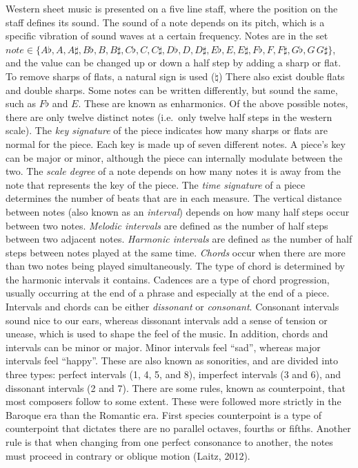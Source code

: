 \documentclass[12pt,twoside]{reedthesis}
\theoremstyle{definition}
\theoremstyle{definition}
\theoremstyle{definition}
\theoremstyle{remark}
\begin{document}
Western sheet music is presented on a five line staff, where the
position on the staff defines its sound. The sound of a note depends on
its pitch, which is a specific vibration of sound waves at a certain
frequency. Notes are in the set
\(note \in \{A\flat,A,A\sharp,B\flat,B,B\sharp,C\flat,C,C\sharp,D\flat,D,D\sharp,E\flat,E,E\sharp,F\flat,F,F\sharp,G\flat,G\,G\sharp\}\),
and the value can be changed up or down a half step by adding a sharp or
flat. To remove sharps of flats, a natural sign is used (\(\natural\))
There also exist double flats and double sharps. Some notes can be
written differently, but sound the same, such as \(F\flat\) and \(E\).
These are known as enharmonics. Of the above possible notes, there are
only twelve distinct notes (i.e.~only twelve half steps in the western
scale). The \emph{key signature} of the piece indicates how many sharps
or flats are normal for the piece. Each key is made up of seven
different notes. A piece's key can be major or minor, although the piece
can internally modulate between the two. The \emph{scale degree} of a
note depends on how many notes it is away from the note that represents
the key of the piece. The \emph{time signature} of a piece determines
the number of beats that are in each measure. The vertical distance
between notes (also known as an \emph{interval}) depends on how many
half steps occur between two notes. \emph{Melodic intervals} are defined
as the number of half steps between two adjacent notes. \emph{Harmonic
intervals} are defined as the number of half steps between notes played
at the same time. \emph{Chords} occur when there are more than two notes
being played simultaneously. The type of chord is determined by the
harmonic intervals it contains. Cadences are a type of chord
progression, usually occurring at the end of a phrase and especially at
the end of a piece. Intervals and chords can be either \emph{dissonant}
or \emph{consonant}. Consonant intervals sound nice to our ears, whereas
dissonant intervals add a sense of tension or unease, which is used to
shape the feel of the music. In addition, chords and intervals can be
minor or major. Minor intervals feel ``sad'', whereas major intervals
feel ``happy''. These are also known as sonorities, and are divided into
three types: perfect intervals (1, 4, 5, and 8), imperfect intervals (3
and 6), and dissonant intervals (2 and 7). There are some rules, known
as counterpoint, that most composers follow to some extent. These were
followed more strictly in the Baroque era than the Romantic era. First
species counterpoint is a type of counterpoint that dictates there are
no parallel octaves, fourths or fifths. Another rule is that when
changing from one perfect consonance to another, the notes must proceed
in contrary or oblique motion (Laitz, 2012).
\end{document}
